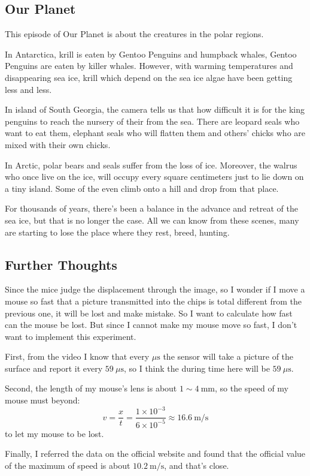 \documentclass{article}
\begin{document}
\subsection{Our Planet}
This episode of Our Planet is about the creatures in the polar regions.

In Antarctica, krill is eaten by Gentoo Penguins and humpback whales, Gentoo Penguins are eaten by killer whales. However, with warming temperatures and disappearing sea ice, krill which depend on the sea ice algae have been getting less and less.

In island of South Georgia, the camera tells us that how difficult it is for the king penguins to reach the nursery of their from the sea. There are leopard seals who want to eat them, elephant seals who will flatten them and others' chicks who are mixed with their own chicks.

In Arctic, polar bears and seals suffer from the loss of ice. Moreover, the walrus who once live on the ice, will occupy every square centimeters just to lie down on a tiny island. Some of the even climb onto a hill and drop from that place.

For thousands of years, there's been a balance in the advance and retreat of the sea ice, but that is no longer the case. All we can know from these scenes, many are starting to lose the place where they rest, breed, hunting.

\subsection{Further Thoughts}
Since the mice judge the displacement through the image, so I wonder if I move a mouse so fast that a picture transmitted into the chips is total different from the previous one, it will be lost and make mistake. So I want to calculate how fast can the mouse be lost. But since I cannot make my mouse move so fast, I don't want to implement this experiment.

First, from the video I know that every $\mu\mathrm{s}$ the sensor will take a picture of the surface and report it every $59 ~ \mu\mathrm{s}$, so I think the during time here will be $59 ~ \mu \mathrm{s}$. 

Second, the length of my mouse's lens is about $1 \sim 4 ~ \mathrm{mm}$, so the speed of my mouse must beyond:
$$
v = \frac{x}{t} = \frac{1 \times 10^{-3}}{6 \times 10^{-5}} \approx 16.6 ~\mathrm{m/s}
$$
to let my mouse to be lost.

Finally, I referred the data on the official website and found that the official value of the maximum of speed is about $10.2 ~\mathrm{m/s}$, and that's close.
\end{document}

